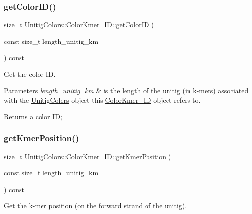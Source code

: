 \subsubsection{\texorpdfstring{get\+Color\+I\+D()}{getColorID()}}
{\footnotesize\ttfamily size\+\_\+t Unitig\+Colors\+::\+Color\+Kmer\+\_\+\+I\+D\+::get\+Color\+ID (\begin{DoxyParamCaption}\item[{const size\+\_\+t}]{length\+\_\+unitig\+\_\+km }\end{DoxyParamCaption}) const\hspace{0.3cm}{\ttfamily [inline]}}



Get the color ID. 


\begin{DoxyParams}{Parameters}
{\em length\+\_\+unitig\+\_\+km} & is the length of the unitig (in k-\/mers) associated with the \hyperlink{classUnitigColors}{Unitig\+Colors} object this \hyperlink{classUnitigColors_1_1ColorKmer__ID}{Color\+Kmer\+\_\+\+ID} object refers to. \\
\hline
\end{DoxyParams}
\begin{DoxyReturn}{Returns}
a color ID; 
\end{DoxyReturn}
\mbox{\label{classUnitigColors_1_1ColorKmer__ID_a53c6284450e368baf4373409b802fe0b}} 
\subsubsection{\texorpdfstring{get\+Kmer\+Position()}{getKmerPosition()}}
{\footnotesize\ttfamily size\+\_\+t Unitig\+Colors\+::\+Color\+Kmer\+\_\+\+I\+D\+::get\+Kmer\+Position (\begin{DoxyParamCaption}\item[{const size\+\_\+t}]{length\+\_\+unitig\+\_\+km }\end{DoxyParamCaption}) const\hspace{0.3cm}{\ttfamily [inline]}}



Get the k-\/mer position (on the forward strand of the unitig). 


